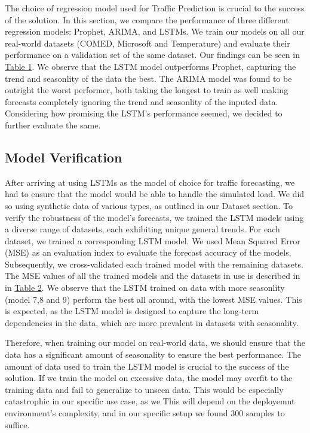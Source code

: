 The choice of regression model used for Traffic Prediction is crucial to the success of the solution.
In this section, we compare the performance of three different regression models: Prophet, ARIMA, and LSTMs.
We train our models on all our real-world datasets (COMED, Microsoft and Temperature) and evaluate their performance on a validation set of the same dataset.
Our findings can be seen in \hyperref[tab:model_comp]{Table 1}.
We observe that the LSTM model outperforms Prophet, capturing the trend and seasonlity of the data the best.
The ARIMA model was found to be outright the worst performer, both taking the longest to train as well making forecasts completely ignoring the trend and seasonlity of the inputed data.
Considering how promising the LSTM's performance seemed, we decided to further evaluate the same.

\subsection{Model Verification}


After arriving at using LSTMs as the model of choice for traffic forecasting, we had to ensure that the model would be able to handle the simulated load. 
We did so using synthetic data of various types, as outlined in our Dataset section.
To verify the robustness of the model's forecasts, we trained the LSTM models using a diverse range of datasets, each exhibiting unique general trends.
For each dataset, we trained a corresponding LSTM model. 
We used Mean Squared Error (MSE) as an evaluation index to evaluate the forecast accuracy of the models.
Subsequently, we cross-validated each trained model with the remaining datasets.
The MSE values of all the trained models and the datasets in use is described in in \hyperref[tab:lstm_performance]{Table 2}.
We observe that the LSTM trained on data with more seasonlity (model 7,8 and 9) perform the best all around, with the lowest MSE values.
This is expected, as the LSTM model is designed to capture the long-term dependencies in the data, which are more prevalent in datasets with seasonality.
  
Therefore, when training our model on real-world data, we should ensure that the data has a significant amount of seasonality to ensure the best performance.  
The amount of data used to train the LSTM model is crucial to the success of the solution.
If we train the model on excessive data, the model may overfit to the training data and fail to generalize to unseen data.
This would be especially catastrophic in our specific use case, as we
This will depend on the deployemnt environment's complexity, and in our specific setup we found 300 samples to suffice.

